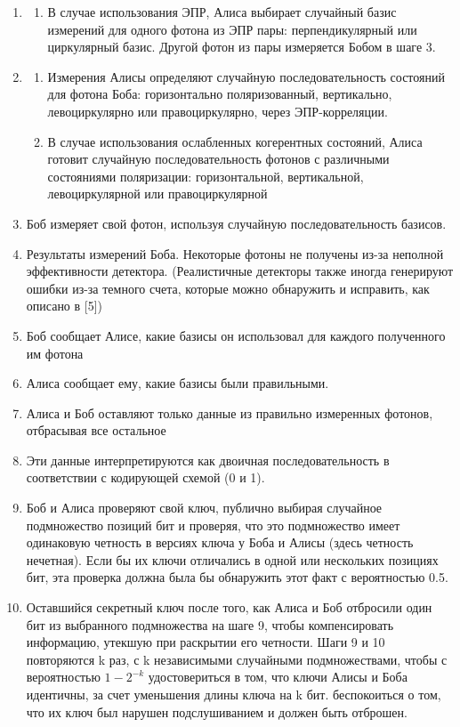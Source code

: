 \begin{enumerate}
    \item \begin{enumerate}
        \item В случае использования ЭПР, Алиса выбирает случайный базис измерений для одного фотона из ЭПР пары: перпендикулярный или циркулярный базис. Другой фотон из пары измеряется Бобом в шаге 3.
    \end{enumerate}
    \item \begin{enumerate}
        \item Измерения Алисы определяют случайную последовательность состояний для фотона Боба: горизонтально поляризованный, вертикально, левоциркулярно или правоциркулярно, через ЭПР-корреляции.
        \item В случае использования ослабленных когерентных состояний, Алиса готовит случайную последовательность фотонов с различными состояниями поляризации: горизонтальной, вертикальной, левоциркулярной или правоциркулярной
    \end{enumerate}
    \item Боб измеряет свой фотон, используя случайную последовательность базисов.
    \item Результаты измерений Боба. Некоторые фотоны не получены из-за неполной эффективности детектора. (Реалистичные детекторы также иногда генерируют ошибки из-за темного счета, которые можно обнаружить и исправить, как описано в [5])
    \item Боб сообщает Алисе, какие базисы он использовал для каждого полученного им фотона
    \item Алиса сообщает ему, какие базисы были правильными.
    \item Алиса и Боб оставляют только данные из правильно измеренных фотонов, отбрасывая все остальное
    \item Эти данные интерпретируются как двоичная последовательность в соответствии с кодирующей схемой (0 и 1).
    \item Боб и Алиса проверяют свой ключ, публично выбирая случайное подмножество позиций бит и проверяя, что это подмножество имеет одинаковую четность в версиях ключа у Боба и Алисы (здесь четность нечетная). Если бы их ключи отличались в одной или нескольких позициях бит, эта проверка должна была бы обнаружить этот факт с вероятностью 0.5.
    \item Оставшийся секретный ключ после того, как Алиса и Боб отбросили один бит из выбранного подмножества на шаге 9, чтобы компенсировать информацию, утекшую при раскрытии его четности. Шаги 9 и 10 повторяются k раз, с k независимыми случайными подмножествами, чтобы с вероятностью $1 - 2^{-k}$ удостовериться в том, что ключи Алисы и Боба идентичны, за счет уменьшения длины ключа на k бит. беспокоиться о том, что их ключ был нарушен подслушиванием и должен быть отброшен. 
\end{enumerate}

